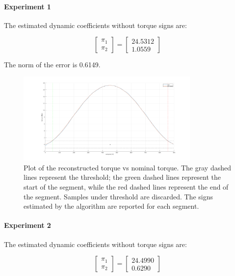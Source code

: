 \documentclass{article}
\begin{document}
\paragraph{Experiment 1} The estimated dynamic coefficients without torque signs are:

\[\begin{bmatrix}
\pi_1  \\ \pi_2 
\end{bmatrix}=\begin{bmatrix}
24.5312 \\ 1.0559
\end{bmatrix}\]

The norm of the error is 0.6149.

\begin{figure}[!htbp]
\centering
\includegraphics[width=0.8\textwidth]{images/1-dof/results_new_experiment1.png}
\caption{Plot of the reconstructed torque vs nominal torque. The gray dashed lines represent the threshold; the green dashed lines represent the start of the segment, while the red dashed lines represent the end of the segment. Samples under threshold are discarded. The signs estimated by the algorithm are reported for each segment.}
\end{figure}
\FloatBarrier
\paragraph{Experiment 2} The estimated dynamic coefficients without torque signs are:

\[\begin{bmatrix}
\pi_1  \\ \pi_2 
\end{bmatrix}=\begin{bmatrix}
24.4990 \\ 0.6290
\end{bmatrix}\]
\end{document}
